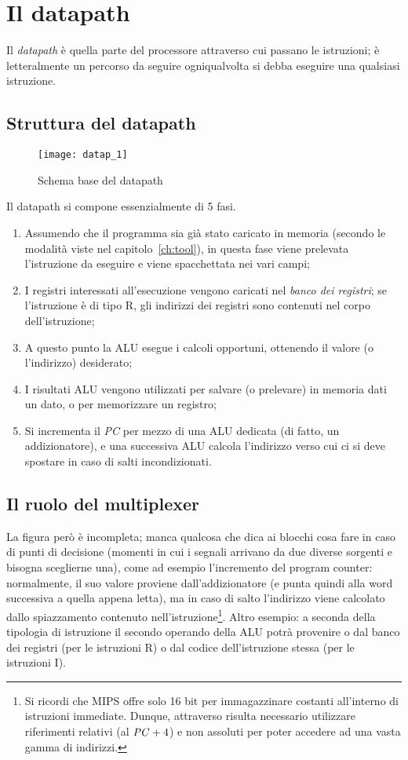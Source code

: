 \section{Il datapath}
Il \emph{datapath} è quella parte del processore attraverso cui passano le istruzioni; è letteralmente un percorso da seguire ogniqualvolta si debba eseguire una qualsiasi istruzione.

\subsection{Struttura del datapath}
\begin{figure}[H]
	\centering
	\texttt{[image: datap\_1]}
	\caption{Schema base del datapath}
\end{figure}
Il datapath si compone essenzialmente di 5 fasi.
\begin{enumerate}
  \item Assumendo che il programma sia già stato caricato in memoria (secondo le modalità viste nel capitolo~\ref{ch:tool}), in questa fase viene prelevata l'istruzione da eseguire e viene spacchettata nei vari campi;
  \item I registri interessati all'esecuzione vengono caricati nel \emph{banco dei registri}; se l'istruzione è di tipo R, gli indirizzi dei registri sono contenuti nel corpo dell'istruzione;
  \item A questo punto la ALU esegue i calcoli opportuni, ottenendo il valore (o l'indirizzo) desiderato;
  \item I risultati ALU vengono utilizzati per salvare (o prelevare) in memoria dati un dato, o per memorizzare un registro;
  \item Si incrementa il \emph{PC} per mezzo di una ALU dedicata (di fatto, un addizionatore), e una successiva ALU calcola l’indirizzo verso cui ci si deve spostare in caso di salti incondizionati.
\end{enumerate}

\subsection{Il ruolo del multiplexer}
La  figura però è incompleta; manca qualcosa che dica ai blocchi cosa fare in caso di punti di decisione (momenti in cui i segnali arrivano da due diverse sorgenti e bisogna sceglierne una), come ad esempio l'incremento del program counter: normalmente, il suo valore proviene dall'addizionatore (e punta quindi alla word successiva a quella appena letta), ma in caso di salto l'indirizzo viene calcolato dallo spiazzamento contenuto nell'istruzione\footnote{Si ricordi che MIPS offre solo 16 bit per immagazzinare costanti all'interno di istruzioni immediate. Dunque, attraverso  risulta necessario utilizzare riferimenti relativi (al \(\textrm{\emph{PC}}+4\)) e non assoluti per poter accedere ad una vasta gamma di indirizzi.}. Altro esempio: a seconda della tipologia di istruzione il secondo operando della ALU potrà provenire o dal banco dei registri (per le istruzioni R) o dal codice dell'istruzione stessa (per le istruzioni I).

